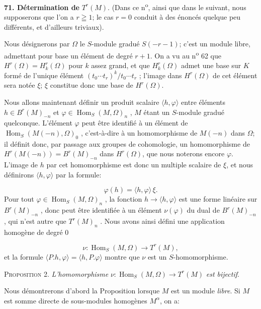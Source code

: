 \textbf{71. Détermination de} $T^r(M)$. (Dans ce n\textsuperscript{o}, ainsi que dans le suivant, nous supposerons que l'on a $r \geqq 1$; le cas $r = 0$ conduit à des énoncés quelque peu différents, et d'ailleurs triviaux).

Nous désignerons par $\Omega$ le $S$-module gradué $S(-r - 1)$; c'est un module libre, admettant pour base un élément de degré $r + 1$. On a vu au n\textsuperscript{o} 62 que $H^r(\Omega) = H_k^r(\Omega)$ pour $k$ assez grand, et que $H_k^r(\Omega)$ admet une base sur $K$ formé de l'unique élément $(t_0 \cdots t_r)^k/t_0 \cdots t_r$ ; l'image dans $H^r(\Omega)$ de cet élément sera notée $\xi$; $\xi$ constitue donc une base de $H^r(\Omega)$.

Nous allons maintenant définir un produit scalaire $\langle h, \varphi \rangle$ entre éléments $h \in B^r(M)_{-n}$ et $\varphi \in \operatorname{Hom}_S(M, \Omega)_n$ , $M$ étant un $S$-module gradué quelconque. L'élément $\varphi$ peut être identifié à un élément de $\operatorname{Hom}_S(M(-n), \Omega)_0$ , c'est-à-dire à un homomorphisme de $M(-n)$ dans $\Omega$; il définit donc, par passage aux groupes de cohomologie, un homomorphisme de $H^r(M(-n)) = B^r(M)_{-n}$ dans $H^r(\Omega)$, que nous noterons encore $\varphi$. L'image de $h$ par cet homomorphisme est donc un multiple scalaire de $\xi$, et nous définirons $\langle h, \varphi \rangle$ par la formule:

\begin{equation*}
\varphi(h) = \langle h, \varphi \rangle \, \xi .
\end{equation*}
Pour tout $\varphi \in \operatorname{Hom}_S(M, \Omega)_n$ , la fonction $h \to \langle h, \varphi \rangle$ est une forme linéaire sur $B^r(M)_{-n}$ , donc peut être identifiée à un élément $\nu(\varphi)$ du dual de $B^r(M)_{-n}$ , qui n'est autre que $T^r(M)_n$ . Nous avons ainsi défini une application homogène de degré 0

\begin{equation*}
\nu : \operatorname{Hom}_S(M, \Omega) \to T^r(M),
\end{equation*}
et la formule $\langle P.h, \varphi \rangle = \langle h, P.\varphi \rangle$ montre que $\nu$ est un $S$-homomorphisme.

\textsc{Proposition} 2. \textit{L'homomorphisme} $\nu : \operatorname{Hom}_S(M, \Omega) \to T^r(M)$ \textit{est bijectif}.

Nous démontrerons d'abord la Proposition lorsque $M$ est un module \textit{libre}. Si $M$ est somme directe de sous-modules homogènes $M^\alpha$, on a:

